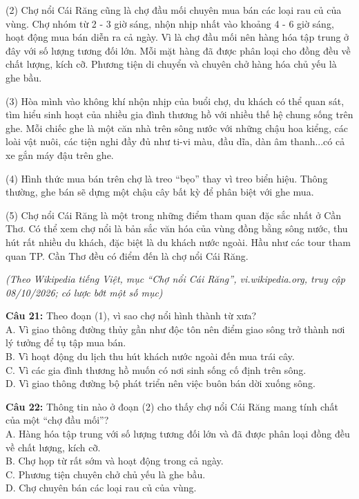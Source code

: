 \documentclass[12pt,a4paper]{article}
\begin{document}
(2) Chợ nổi Cái Răng cũng là chợ đầu mối chuyên mua bán các loại rau củ của vùng. Chợ nhóm từ 2 - 3 giờ sáng, nhộn nhịp nhất vào khoảng 4 - 6 giờ sáng, hoạt động mua bán diễn ra cả ngày. Vì là chợ đầu mối nên hàng hóa tập trung ở đây với số lượng tương đối lớn. Mỗi mặt hàng đã được phân loại cho đồng đều về chất lượng, kích cỡ. Phương tiện di chuyển và chuyên chở hàng hóa chủ yếu là ghe bầu.

(3) Hòa mình vào không khí nhộn nhịp của buổi chợ, du khách có thể quan sát, tìm hiểu sinh hoạt của nhiều gia đình thương hồ với nhiều thế hệ chung sống trên ghe. Mỗi chiếc ghe là một căn nhà trên sông nước với những chậu hoa kiểng, các loài vật nuôi, các tiện nghi đầy đủ như ti-vi màu, đầu dĩa, dàn âm thanh...có cả xe gắn máy đậu trên ghe.

(4) Hình thức mua bán trên chợ là treo ``bẹo'' thay vì treo biển hiệu. Thông thường, ghe bán sẽ dựng một chậu cây bất kỳ để phân biệt với ghe mua.

(5) Chợ nổi Cái Răng là một trong những điểm tham quan đặc sắc nhất ở Cần Thơ. Có thể xem chợ nổi là bản sắc văn hóa của vùng đồng bằng sông nước, thu hút rất nhiều du khách, đặc biệt là du khách nước ngoài. Hầu như các tour tham quan TP. Cần Thơ đều có điểm đến là chợ nổi Cái Răng.
\begin{flushright}\small\textit{(Theo Wikipedia tiếng Việt, mục ``Chợ nổi Cái Răng'', vi.wikipedia.org, truy cập 08/10/2026; có lược bớt một số mục)}\end{flushright}

\par\nobreak


\noindent \textbf{Câu 21:} Theo đoạn (1), vì sao chợ nổi hình thành từ xưa?\\
\noindent A. Vì giao thông đường thủy gần như độc tôn nên điểm giao sông trở thành nơi lý tưởng để tụ tập mua bán.\\
\noindent B. Vì hoạt động du lịch thu hút khách nước ngoài đến mua trái cây.\\
\noindent C. Vì các gia đình thương hồ muốn có nơi sinh sống cố định trên sông.\\
\noindent D. Vì giao thông đường bộ phát triển nên việc buôn bán dời xuống sông.



\vspace{0.3cm}

\noindent \textbf{Câu 22:} Thông tin nào ở đoạn (2) cho thấy chợ nổi Cái Răng mang tính chất của một ``chợ đầu mối''?\\
\noindent A. Hàng hóa tập trung với số lượng tương đối lớn và đã được phân loại đồng đều về chất lượng, kích cỡ.\\
\noindent B. Chợ họp từ rất sớm và hoạt động trong cả ngày.\\
\noindent C. Phương tiện chuyên chở chủ yếu là ghe bầu.\\
\noindent D. Chợ chuyên bán các loại rau củ của vùng.
\end{document}
